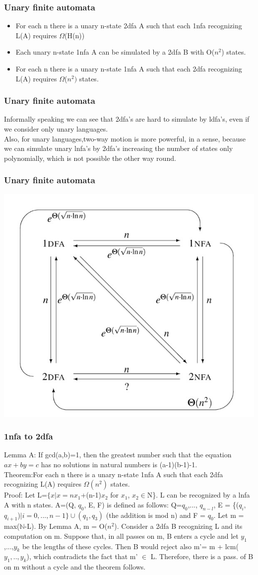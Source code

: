 \documentclass{beamer}
\begin{document}
\begin{frame}
\frametitle{Unary finite automata}

 
\begin{itemize}
\item
For each n there is a unary n-state 2dfa A such that each 1nfa recognizing L(A) requires $\Omega$(H(n))
\item
Each unary n-state 1nfa A can be simulated by a 2dfa B with O($n^2$) states.
\item
For each n there is a unary n-state 1nfa A such that each 2dfa recognizing L(A) requires $\Omega$($n^2)$ states.
\end{itemize}

\end{frame}
\begin{frame}
\frametitle{Unary finite automata}
Informally speaking we can see that 2dfa's are hard to simulate by ldfa's, even if we consider only unary languages.\\
\medskip
Also, for unary languages,two-way motion is more powerful, in a sense, because we can simulate unary lnfa's by 2dfa's increasing the number of states only polynomially, which is not possible the other way round. 
\end{frame}
\begin{frame}
\frametitle{Unary finite automata}
\includegraphics[width = 200 pt]{x}
\end{frame}
\begin{frame}
\frametitle{1nfa to 2dfa}
Lemma A: If gcd(a,b)=1, then the greatest number such that the equation $ax+by=c$ has no solutions in natural numbers is (a-1)(b-1)-1.\\
\medskip
Theorem:For each n there is a unary n-state 1nfa A such that each 2dfa recognizing L(A) requires $\Omega(n^2)$ states.\\
\medskip
Proof: Let L=$\{x| x= n x_1$+(n-1)$x_2$ for $x_1$, $x_2\in$N\}. L can be recognized by a lnfa
A with n states. A=(Q, $q_0$, E, F) is defined as follows: Q={$q_0$,..., $q_{n-l}$}, E =
\{($q_i$, $q_{i+1}$)$| i = 0,..., n- 1\}\cup {(q_1, q_3)}$ (the addition is mod n) and F = {$q_0$}. Let
m = max($\mathbb{N}$-L). By Lemma A, m = O($n^2$). Consider a 2dfa B recognizing L and its
computation on m. Suppose that, in all passes on m, B enters a cycle and let
$y_1$,...,$y_k$ be the lengths of these cycles. Then B would reject also m'=
m + lcm($y_1,.. , y_k$), which contradicts the fact that m' $\in$ L. Therefore, there is a pass.
of B on m without a cycle and the theorem follows. 

\end{frame}
\end{document}
